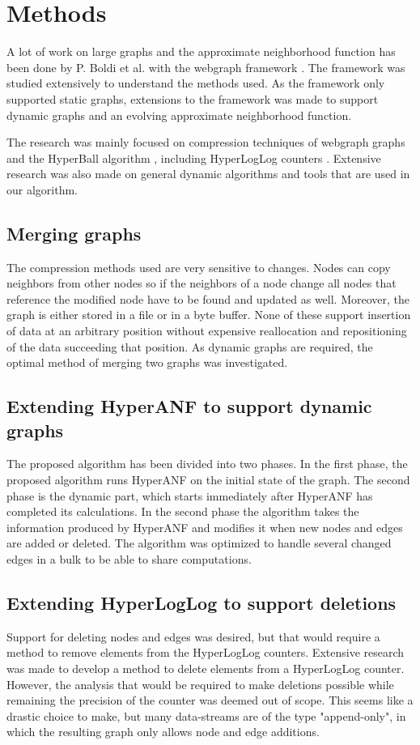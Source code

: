 \chapter{Methods}

A lot of work on large graphs and the approximate neighborhood function has been done by P. Boldi et al. with the webgraph framework \cite{webgraph}. The framework was studied extensively to understand the methods used. As the framework only supported static graphs, extensions to the framework was made to support dynamic graphs and an evolving approximate neighborhood function. 

The research was mainly focused on compression techniques of webgraph graphs \cite{webgraph-compression} and the HyperBall algorithm \cite{hyperball}, including HyperLogLog counters \cite{hyperloglog}. Extensive research was also made on general dynamic algorithms and tools that are used in our algorithm.


\section{Merging graphs}
The compression methods used are very sensitive to changes. Nodes can copy neighbors from other nodes so if the neighbors of a node change all nodes that reference the modified node have to be found and updated as well. Moreover, the graph is either stored in a file or in a byte buffer. None of these support insertion of data at an arbitrary position without expensive reallocation and repositioning of the data succeeding that position. As dynamic graphs are required, the optimal method of merging two graphs was investigated. 


\section{Extending HyperANF to support dynamic graphs}
The proposed algorithm has been divided into two phases. In the first phase, the proposed algorithm runs HyperANF on the initial state of the graph. The second phase is the dynamic part, which starts immediately after HyperANF has completed its calculations. In the second phase the algorithm takes the information produced by HyperANF and modifies it when new nodes and edges are added or deleted. The algorithm was optimized to handle several changed edges in a bulk to be able to share computations.

\section{Extending HyperLogLog to support deletions}
Support for deleting nodes and edges was desired, but that would require a method to remove elements from the HyperLogLog counters. Extensive research was made to develop a method to delete elements from a HyperLogLog counter. However, the analysis that would be required to make deletions possible while remaining the precision of the counter was deemed out of scope. This seems like a drastic choice to make, but many data-streams are of the type "append-only", in which the resulting graph only allows node and edge additions.

